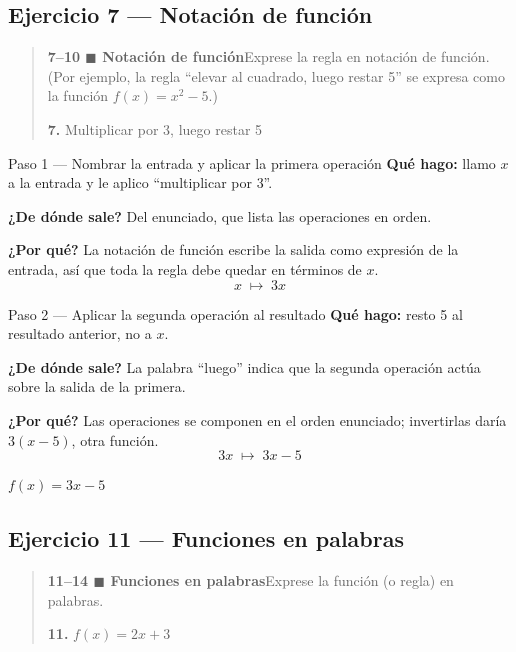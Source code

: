 \documentclass[11pt]{article}
\begin{document}
\subsection*{Ejercicio 7 — Notación de función}

\begin{quote}
\textbf{7--10 $\blacksquare$ Notación de función}\quad Exprese la regla en notación de función. (Por ejemplo, la regla ``elevar al cuadrado, luego restar 5'' se expresa como la función $f(x)=x^2-5$.)

\textbf{7.} Multiplicar por 3, luego restar 5
\end{quote}

\begin{paso}{Paso 1 --- Nombrar la entrada y aplicar la primera operación}
\textbf{Qué hago:} llamo $x$ a la entrada y le aplico ``multiplicar por 3''.

\textbf{¿De dónde sale?} Del enunciado, que lista las operaciones en orden.

\textbf{¿Por qué?} La notación de función escribe la salida como expresión de la entrada, así que toda la regla debe quedar en términos de $x$.
\[
x \;\longmapsto\; 3x
\]
\end{paso}

\begin{paso}{Paso 2 --- Aplicar la segunda operación al resultado}
\textbf{Qué hago:} resto 5 al resultado anterior, no a $x$.

\textbf{¿De dónde sale?} La palabra ``luego'' indica que la segunda operación actúa sobre la salida de la primera.

\textbf{¿Por qué?} Las operaciones se componen en el orden enunciado; invertirlas daría $3(x-5)$, otra función.
\[
3x \;\longmapsto\; 3x-5
\]
\end{paso}

\begin{resp}
$f(x)=3x-5$
\end{resp}

\subsection*{Ejercicio 11 — Funciones en palabras}

\begin{quote}
\textbf{11--14 $\blacksquare$ Funciones en palabras}\quad Exprese la función (o regla) en palabras.

\textbf{11.} $f(x)=2x+3$
\end{quote}
\end{document}
